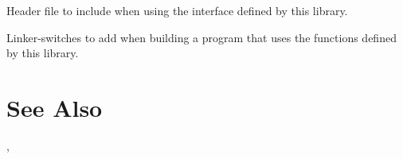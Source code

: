 \documentclass{article}
\begin{document}
\begin{Description}
\item[\File{libunwind-coredump.h}] Header file to include when using the
  interface defined by this library.
\item[\Opt{-l}\File{unwind-coredump} \Opt{-l}\File{unwind-generic}]
    Linker-switches to add when building a program that uses the
    functions defined by this library.
\end{Description}

\section{See Also}

,

\LatexManEnd
\end{document}

